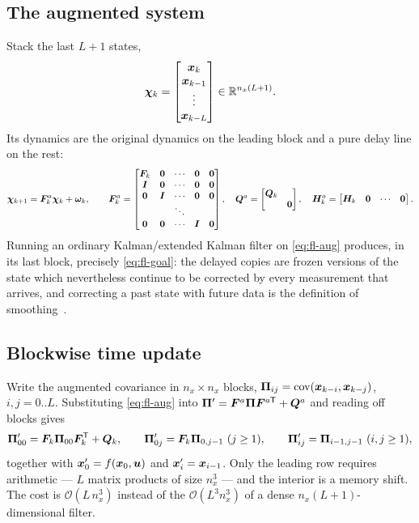 \subsection{The augmented system}
Stack the last $L+1$ states,
\begin{equation}
\bm{\chi}_k=\begin{bmatrix}\bm{x}_k\\ \bm{x}_{k-1}\\ \vdots\\ \bm{x}_{k-L}\end{bmatrix}\in\mathbb{R}^{n_x(L+1)} .
\label{eq:fl-chi}
\end{equation}
Its dynamics are the original dynamics on the leading block and a pure delay line on the rest:
\begin{equation}
\bm{\chi}_{k+1}=\bm{F}^a_k\bm{\chi}_k+\bm{\omega}_k,\qquad
\bm{F}^a_k=\begin{bmatrix}
\bm{F}_k & \bm 0 & \cdots & \bm 0 & \bm 0\\
\bm{I}   & \bm 0 & \cdots & \bm 0 & \bm 0\\
\bm 0 & \bm{I}   & \cdots & \bm 0 & \bm 0\\
      &       & \ddots &       &      \\
\bm 0 & \bm 0 & \cdots & \bm{I}   & \bm 0
\end{bmatrix},
\quad
\bm{Q}^a=\begin{bmatrix}\bm{Q}_k&\\&\bm 0\end{bmatrix},
\quad
\bm{H}^a_k=\begin{bmatrix}\bm{H}_k&\bm 0&\cdots&\bm 0\end{bmatrix} .
\label{eq:fl-aug}
\end{equation}
Running an ordinary Kalman/extended Kalman filter on \eqref{eq:fl-aug} produces, in its last block,
precisely \eqref{eq:fl-goal}: the delayed copies are frozen versions of the state which nevertheless
continue to be corrected by every measurement that arrives, and correcting a past state with future
data is the definition of smoothing~\cite[§7.3]{andersonmoore1979}.

\subsection{Blockwise time update}
Write the augmented covariance in $n_x\times n_x$ blocks,
$\bm{\Pi}_{ij}=\operatorname{cov}(\bm{x}_{k-i},\bm{x}_{k-j})$, $i,j=0..L$.  Substituting \eqref{eq:fl-aug}
into $\bm{\Pi}'=\bm{F}^a\bm{\Pi}\bm{F}^{a\mathsf{T}}+\bm{Q}^a$ and reading off blocks gives
\begin{equation}
\bm{\Pi}'_{00}=\bm{F}_k\bm{\Pi}_{00}\bm{F}_k^{\mathsf{T}}+\bm{Q}_k,
\qquad
\bm{\Pi}'_{0j}=\bm{F}_k\bm{\Pi}_{0,j-1}\ (j\ge1),
\qquad
\bm{\Pi}'_{ij}=\bm{\Pi}_{i-1,j-1}\ (i,j\ge1),
\label{eq:fl-tu}
\end{equation}
together with $\bm{x}'_0=f(\bm{x}_0,\bm{u})$ and $\bm{x}'_i=\bm{x}_{i-1}$.  Only the leading row requires
arithmetic --- $L$ matrix products of size $n_x^3$ --- and the interior is a memory shift.  The cost
is $\mathcal{O}(L\,n_x^3)$ instead of the $\mathcal{O}(L^3n_x^3)$ of a dense
$n_x(L+1)$-dimensional filter.

